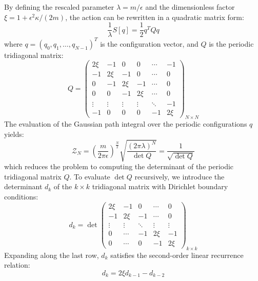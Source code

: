By defining the rescaled parameter $\lambda = m/\epsilon$ and the dimensionless factor $\xi = 1 + \epsilon^2 \kappa / (2m)$, the action can be rewritten in a quadratic matrix form:
\begin{equation}
\frac{1}{\lambda} S[q] = \frac{1}{2} q^T Q q
\label{eq:ho_matrix_action}
\end{equation}
where $q = (q_0, q_1, \dots, q_{N-1})^T$ is the configuration vector, and $Q$ is the periodic tridiagonal matrix:
\begin{equation}
Q =
\begin{pmatrix}
  2\xi   & -1     & 0      & 0      & \cdots & -1 \\
  -1     & 2\xi   & -1     & 0      & \cdots & 0 \\
   0     & -1     & 2\xi   & -1     & \cdots & 0 \\
   0     & 0      & -1     & 2\xi   & \cdots & 0 \\
  \vdots & \vdots & \vdots & \vdots & \ddots & -1 \\
  -1     & 0      & 0      & 0      & -1     & 2\xi
\end{pmatrix}_{N \times N}
\label{eq:ho_matrix_Q}
\end{equation}
The evaluation of the Gaussian path integral over the periodic configurations $q$ yields:
\begin{equation}
\mathcal{Z}_N = \left(\frac{m}{2 \pi \epsilon}\right)^{\frac{N}{2}} \sqrt{\frac{(2\pi \lambda)^N}{\det Q}} = \frac{1}{\sqrt{\det Q}}
\label{eq:gaussian_integral_sol}
\end{equation}
which reduces the problem to computing the determinant of the periodic tridiagonal matrix $Q$. To evaluate $\det Q$ recursively, we introduce the determinant $d_k$ of the $k \times k$ tridiagonal matrix with Dirichlet boundary conditions:
\begin{equation}
d_k = \det \begin{pmatrix}
  2\xi   & -1     & 0      & \cdots & 0 \\
  -1     & 2\xi   & -1     & \cdots & 0 \\
  \vdots & \vdots & \ddots & \vdots & \vdots \\
  0      & \cdots & -1     & 2\xi   & -1 \\
  0      & \cdots & 0      & -1     & 2\xi
\end{pmatrix}_{k \times k}
\end{equation}
Expanding along the last row, $d_k$ satisfies the second-order linear recurrence relation:
\begin{equation}
d_k = 2\xi d_{k-1} - d_{k-2}
\label{eq:det_recurrence}
\end{equation}
